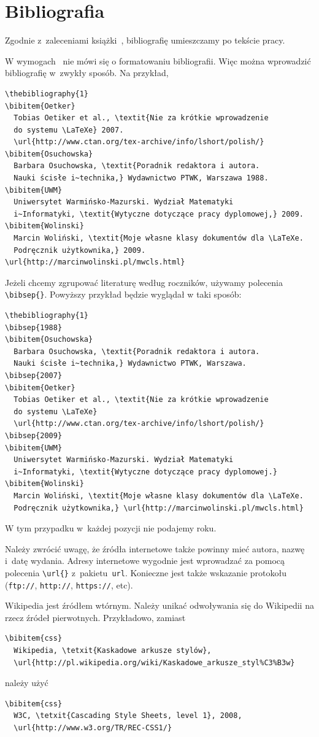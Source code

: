 \documentclass[wmii, inf, mgr]{uwmthesis}
\begin{document}
\section{Bibliografia}
Zgodnie z~zaleceniami książki~\cite{Osuchowska}, bibliografię umieszczamy po tekście pracy. 

W wymogach~\cite{UWM} nie mówi się o formatowaniu bibliografii. Więc można wprowadzić bibliografię w~zwykły sposób. Na przykład,
\begin{verbatim}
\thebibliography{1}
\bibitem{Oetker}
  Tobias Oetiker et al., \textit{Nie za krótkie wprowadzenie
  do systemu \LaTeXe} 2007. 
  \url{http://www.ctan.org/tex-archive/info/lshort/polish/}
\bibitem{Osuchowska}
  Barbara Osuchowska, \textit{Poradnik redaktora i autora.
  Nauki ścisłe i~technika,} Wydawnictwo PTWK, Warszawa 1988.
\bibitem{UWM}
  Uniwersytet Warmińsko-Mazurski. Wydział Matematyki
  i~Informatyki, \textit{Wytyczne dotyczące pracy dyplomowej,} 2009. 
\bibitem{Wolinski}
  Marcin Woliński, \textit{Moje własne klasy dokumentów dla \LaTeXe.
  Podręcznik użytkownika,} 2009. \url{http://marcinwolinski.pl/mwcls.html}
\end{verbatim}

Jeżeli chcemy zgrupować literaturę według roczników, używamy polecenia \verb|\bibsep{}|. Powyższy przykład będzie wyglądał w taki sposób:
\begin{verbatim}
\thebibliography{1}
\bibsep{1988}
\bibitem{Osuchowska}
  Barbara Osuchowska, \textit{Poradnik redaktora i autora.
  Nauki ścisłe i~technika,} Wydawnictwo PTWK, Warszawa.
\bibsep{2007}
\bibitem{Oetker}
  Tobias Oetiker et al., \textit{Nie za krótkie wprowadzenie
  do systemu \LaTeXe}
  \url{http://www.ctan.org/tex-archive/info/lshort/polish/}
\bibsep{2009}
\bibitem{UWM}
  Uniwersytet Warmińsko-Mazurski. Wydział Matematyki
  i~Informatyki, \textit{Wytyczne dotyczące pracy dyplomowej.}
\bibitem{Wolinski}
  Marcin Woliński, \textit{Moje własne klasy dokumentów dla \LaTeXe.
  Podręcznik użytkownika,} \url{http://marcinwolinski.pl/mwcls.html}
\end{verbatim}
W tym przypadku w~każdej pozycji nie podajemy roku.


Należy zwrócić uwagę, że źródła internetowe także powinny mieć autora, nazwę i~datę wydania. Adresy internetowe wygodnie jest wprowadzać za pomocą polecenia \verb|\url{}| z~pakietu~\texttt{url}. Konieczne jest także wskazanie protokołu (\texttt{ftp://}, \texttt{http://}, \texttt{https://}, etc).

Wikipedia jest źródłem wtórnym. Należy unikać odwoływania się do Wikipedii na rzecz źródeł pierwotnych. Przykładowo, zamiast
\begin{verbatim}
\bibitem{css}
  Wikipedia, \tetxit{Kaskadowe arkusze stylów},
  \url{http://pl.wikipedia.org/wiki/Kaskadowe_arkusze_styl%C3%B3w}
\end{verbatim}
należy użyć
\begin{verbatim}
\bibitem{css}
  W3C, \tetxit{Cascading Style Sheets, level 1}, 2008,
  \url{http://www.w3.org/TR/REC-CSS1/}
\end{verbatim}
\end{document}
